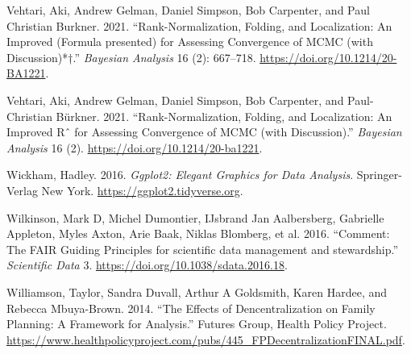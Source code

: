 \begin{CSLReferences}{1}{0}
\leavevmode{}%
Vehtari, Aki, Andrew Gelman, Daniel Simpson, Bob Carpenter, and Paul Christian Burkner. 2021. {``{Rank-Normalization, Folding, and Localization: An Improved (Formula presented) for Assessing Convergence of MCMC (with Discussion)*†}.''} \emph{Bayesian Analysis} 16 (2): 667--718. \url{https://doi.org/10.1214/20-BA1221}.

\leavevmode{}%
Vehtari, Aki, Andrew Gelman, Daniel Simpson, Bob Carpenter, and Paul-Christian Bürkner. 2021. {``Rank-Normalization, Folding, and Localization: An Improved Rˆ for Assessing Convergence of MCMC (with Discussion).''} \emph{Bayesian Analysis} 16 (2). \url{https://doi.org/10.1214/20-ba1221}.

\leavevmode{}%
Wickham, Hadley. 2016. \emph{Ggplot2: Elegant Graphics for Data Analysis}. Springer-Verlag New York. \url{https://ggplot2.tidyverse.org}.

\leavevmode{}%
Wilkinson, Mark D, Michel Dumontier, IJsbrand Jan Aalbersberg, Gabrielle Appleton, Myles Axton, Arie Baak, Niklas Blomberg, et al. 2016. {``{Comment: The FAIR Guiding Principles for scientific data management and stewardship}.''} \emph{Scientific Data} 3. \url{https://doi.org/10.1038/sdata.2016.18}.

\leavevmode{}%
Williamson, Taylor, Sandra Duvall, Arthur A Goldsmith, Karen Hardee, and Rebecca Mbuya-Brown. 2014. {``{The Effects of Dencentralization on Family Planning: A Framework for Analysis}.''} Futures Group, Health Policy Project. \url{https://www.healthpolicyproject.com/pubs/445_FPDecentralizationFINAL.pdf}.

\end{CSLReferences}



\address{%
Hannah Comiskey\\
Maynooth University\\%
Hamilton Institute\\ Maynooth, Co.Kildare, Ireland\\
%
%
\textit{ORCiD: \href{https://orcid.org/0000-0003-0034-6725}{0000-0003-0034-6725}}\\%
\href{mailto:hannah.comiskey.2015@mumail.ie}{\nolinkurl{hannah.comiskey.2015@mumail.ie}}%
}

\address{%
Niamh Cahill\\
Maynooth University\\%
\\
%
%
%
%
}

